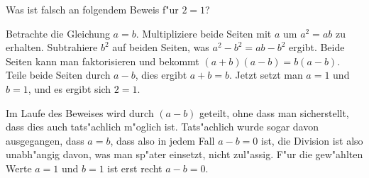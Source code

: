 Was ist falsch an folgendem Beweis f"ur $2=1$?

Betrachte die Gleichung $a=b$. Multipliziere beide Seiten mit
$a$ um $a^2=ab$ zu erhalten. Subtrahiere $b^2$ auf beiden
Seiten, was $a^2-b^2=ab-b^2$ ergibt. Beide Seiten kann man
faktorisieren und bekommt $(a+b)(a-b)=b(a-b)$. Teile beide
Seiten durch $a-b$, dies ergibt $a+b=b$. Jetzt setzt man
$a=1$ und $b=1$, und es ergibt sich $2=1$.

\begin{loesung}
Im Laufe des Beweises wird durch $(a-b)$ geteilt, ohne dass man
sicherstellt, dass dies auch tats"achlich m"oglich ist.
Tats"achlich wurde sogar davon ausgegangen, dass $a=b$, dass
also in jedem Fall $a-b=0$ ist, die Division ist also unabh"angig davon,
was man sp"ater einsetzt, nicht zul"assig.
F"ur die
gew"ahlten Werte $a=1$ und $b=1$  ist erst recht $a-b=0$.
\end{loesung}


